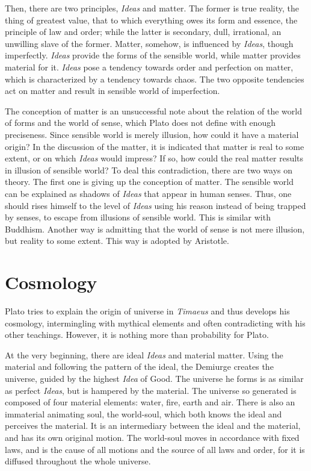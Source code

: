 \documentclass[11pt]{article}
\begin{document}
\newline

Then, there are two principles, \textit{Ideas} and matter. 
The former is true reality, the thing of greatest value, that to which everything owes its form and essence, the principle of law and order; 
while the latter is secondary, dull, irrational, an unwilling slave of the former. 
Matter, somehow, is influenced by \textit{Ideas}, though imperfectly. 
\textit{Ideas} provide the forms of the sensible world, while matter provides material for it. 
\textit{Ideas} pose a tendency towards order and perfection on matter, which is characterized by a tendency towards chaos. 
The two opposite tendencies act on matter and result in sensible world of imperfection.

\newline

The conception of matter is an unsuccessful note about the relation of the world of forms and the world of sense, which Plato does not define with enough preciseness. 
Since sensible world is merely illusion, how could it have a material origin? 
In the discussion of the matter, it is indicated that matter is real to some extent, or on which \textit{Ideas} would impress? 
If so, how could the real matter results in illusion of sensible world? 
To deal this contradiction, there are two ways on theory. 
The first one is giving up the conception of matter. 
The sensible world can be explained as shadows of \textit{Ideas} that appear in human senses. 
Thus, one should rises himself to the level of \textit{Ideas} using his reason instead of being trapped by senses, to escape from illusions of sensible world. 
This is similar with Buddhism. 
Another way is admitting that the world of sense is not mere illusion, but reality to some extent. 
This way is adopted by Aristotle.
  
\section{Cosmology} 
Plato tries to explain the origin of universe in \textit{Timaeus} and thus develops his cosmology, intermingling with mythical elements and often contradicting with his other teachings. 
However, it is nothing more than probability for Plato. 

\newline

At the very beginning, there are ideal \textit{Ideas} and material matter. 
Using the material and following the pattern of the ideal, the Demiurge creates the universe, guided by the highest \textit{Idea} of Good. 
The universe he forms is as similar as perfect \textit{Ideas}, but is hampered by the material. 
The universe so generated is composed of four material elements: 
water, fire, earth and air. 
There is also an immaterial animating soul, the world-soul, which both knows the ideal and perceives the material. 
It is an intermediary between the ideal and the material, and has its own original motion. 
The world-soul moves in accordance with fixed laws, and is the cause of all motions and the source of all laws and order, for it is diffused throughout the whole universe.
\end{document}
